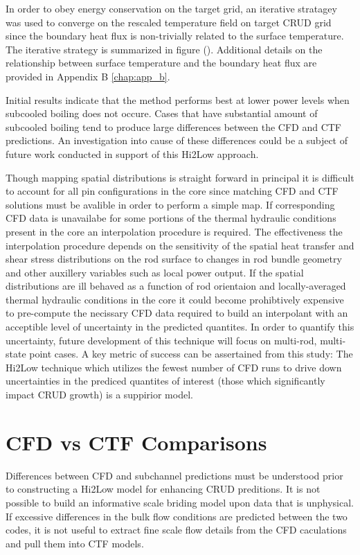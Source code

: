 In order to obey energy conservation on the target grid,  an iterative stratagey was used to converge on the rescaled temperature field on target CRUD grid since the boundary heat flux is non-trivially related to the surface temperature.  The iterative strategy is summarized in figure (). 
Additional details on the relationship between surface temperature and the boundary heat flux are provided in Appendix B \ref{chap:app_b}.

Initial results indicate that the method performs best at lower power levels when subcooled boiling does not occure.  Cases that have substantial amount of subcooled boiling tend to produce large differences between the CFD and CTF predictions.  An investigation into cause of these differences could be a subject of future work conducted in support of this Hi2Low approach.  

Though mapping spatial distributions is straight forward in principal it is difficult to account for all pin configurations in the core since matching CFD and CTF solutions must be avalible in order to perform a simple map.  If corresponding CFD data is unavailabe for some portions of the thermal hydraulic conditions present in the core an interpolation procedure is required.  The effectiveness the interpolation procedure depends on the sensitivity of the spatial heat transfer and shear stress distributions on the rod surface to changes in rod bundle geometry and other auxillery variables such as local power output.  If the spatial distributions are ill behaved as a function of rod orientaion and locally-averaged thermal hydraulic conditions in the core it could become prohibtively expensive to pre-compute the necissary CFD data required to build an interpolant with an acceptible level of uncertainty in the predicted quantites.  In order to quantify this uncertainty, future development of this technique will focus on multi-rod, multi-state point cases.
A key metric of success can be assertained from this study:  The Hi2Low technique which utilizes the fewest number of CFD runs to drive down uncertainties in the prediced quantites of interest (those which significantly impact CRUD growth) is a suppirior model.

\section{CFD vs CTF Comparisons}

Differences between CFD and subchannel predictions must be understood prior to constructing a Hi2Low model for enhancing CRUD preditions.  It is not possible to build an informative scale briding model upon data that is unphysical.  If excessive differences in the bulk flow conditions are predicted between the two codes, it is not useful to extract fine scale flow details from the CFD caculations and pull them into CTF models. 

